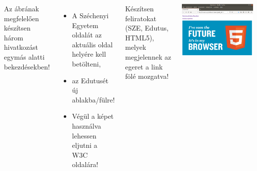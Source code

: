 \documentclass[usenames,dvipsnames,aspectratio=169]{beamer}
\begin{document}
\begin{frame}
  \begin{columns}[c]
      Az ábrának megfelelően készítsen három hivatkozást egymás alatti bekezdésekben!
      \begin{itemize}
        \item A Széchenyi Egyetem oldalát az aktuális oldal helyére kell betölteni,
        \item az Edutusét új ablakba/fülre! 
        \item Végül a  képet használva lehessen eljutni a W3C oldalára!
      \end{itemize}
      Készítsen feliratokat (SZE, Edutus, HTML5), melyek megjelennek az egeret a link fölé mozgatva!
      \begin{center}
        \begin{exampleblock}{}
          \centering \includegraphics[scale=.2]{hivatkozas.png}
        \end{exampleblock}
      \end{center}
  \end{columns}
\end{frame}
\end{document}
